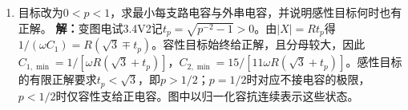 \documentclass[UTF8,fontset=fandol,a4paper,11pt]{ctexart}
\begin{document}
\begin{enumerate}
\item 目标改为$0<p<1$，求最小每支路电容与外串电容，并说明感性目标何时也有正解。
\textbf{解：}变图电试3.4V2记$t_p=\sqrt{p^{-2}-1}>0$。由$|X|=Rt_p$得$1/(\omega C_1)=R(\sqrt3\mp t_p)$。容性目标始终给正解，且分母较大，因此$C_{1,\min}=1/[\omega R(\sqrt3+t_p)]$，$C_{2,\min}=15/[11\omega R(\sqrt3+t_p)]$。感性目标的有限正解要求$t_p<\sqrt3$，即$p>1/2$；$p=1/2$时对应不接电容的极限，$p<1/2$时仅容性支给正电容。图中以归一化容抗连续表示这些状态。
\begin{center}\begin{minipage}{.98\linewidth}\centering
{}
\end{minipage}
\end{center}
\end{enumerate}
\end{document}
